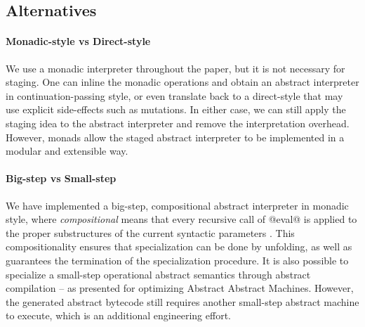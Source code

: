 \subsection{Alternatives}

\paragraph{Monadic-style vs Direct-style} We use a monadic interpreter
throughout the paper, but it is not necessary for staging. One can inline the
monadic operations and obtain an abstract interpreter in continuation-passing
style, or even translate back to a direct-style that may use explicit
side-effects such as mutations. In either case, we can still apply the staging
idea to the abstract interpreter and remove the interpretation overhead.
However, monads allow the staged abstract interpreter to be implemented in a
modular and extensible way.

\paragraph{Big-step vs Small-step}

We have implemented a big-step, compositional abstract interpreter in monadic
style, where \textit{compositional} means that every recursive call of @eval@ %
is applied to the proper substructures of the current syntactic
parameters \cite{10.1007/3-540-61580-6_11}. This compositionality ensures that
specialization can be done by unfolding, as well as guarantees the termination
of the specialization procedure. It is also possible to specialize a small-step
operational abstract semantics through abstract compilation
\cite{Boucher:1996:ACN:647473.727587} -- as
\citet{Johnson:2013:OAA:2500365.2500604} presented for
optimizing Abstract Abstract Machines. However, the generated abstract
bytecode still requires another small-step abstract machine to execute, which is
an additional engineering effort.
